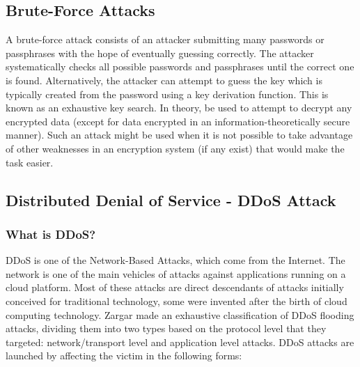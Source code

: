 \documentclass{ijitcs}
\begin{document}
\subsection{Brute-Force Attacks}

A brute-force attack consists of an attacker submitting many passwords or passphrases with the hope of eventually guessing correctly.
The attacker systematically checks all possible passwords and passphrases until the correct one is found. Alternatively, the attacker can attempt to guess the key which is typically created from the password using a key derivation function.
This is known as an exhaustive key search.
In theory, be used to attempt to decrypt any encrypted data (except for data encrypted in an information-theoretically secure manner). Such an attack might be used when it is not possible to take advantage of other weaknesses in an encryption system (if any exist) that would make the task easier\cite{kanakam2022bruteforce}.
\subsection{Distributed Denial of Service - DDoS Attack}
\subsubsection{What is DDoS?}
\par DDoS \cite{coppolino2017cloud} is one of the Network-Based Attacks, which come from the Internet. The network is one of the main vehicles of attacks against applications running on a cloud platform. Most of these attacks are direct descendants of attacks initially conceived for traditional technology, some were invented after the birth of cloud computing technology. Zargar\cite{coppolino2017cloud} made an exhaustive classification of DDoS flooding attacks, dividing them into two types based on the protocol level that they targeted: network/transport level and application level attacks. DDoS attacks are launched by affecting the victim in the following forms:
\end{document}
